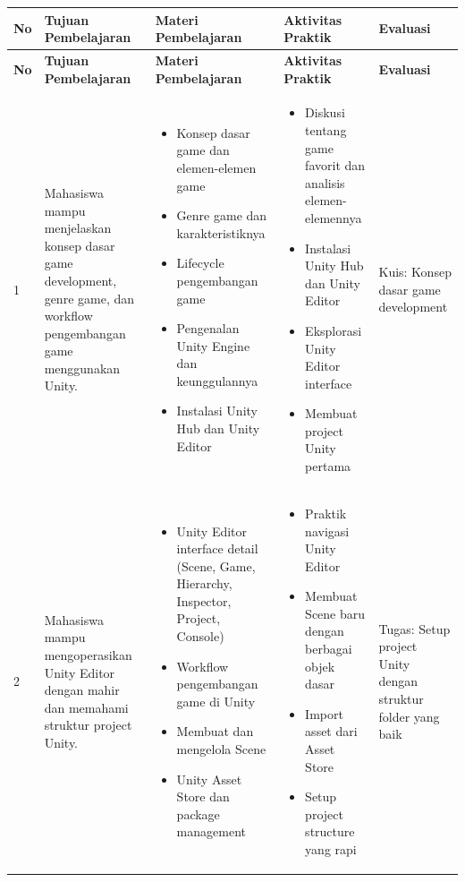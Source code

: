 \begin{longtable}{|p{0.8cm}|p{3.5cm}|p{4cm}|p{4cm}|p{2.5cm}|}
\hline
\textbf{No} & \textbf{Tujuan Pembelajaran} & \textbf{Materi Pembelajaran} & \textbf{Aktivitas Praktik} & \textbf{Evaluasi} \\
\hline
\endfirsthead

\hline
\textbf{No} & \textbf{Tujuan Pembelajaran} & \textbf{Materi Pembelajaran} & \textbf{Aktivitas Praktik} & \textbf{Evaluasi} \\
\hline
\endhead

\hline
\endfoot

\hline
\endlastfoot

1 & Mahasiswa mampu menjelaskan konsep dasar game development, genre game, dan workflow pengembangan game menggunakan Unity. & 
\begin{itemize}[leftmargin=*,nosep]
\item Konsep dasar game dan elemen-elemen game
\item Genre game dan karakteristiknya
\item Lifecycle pengembangan game
\item Pengenalan Unity Engine dan keunggulannya
\item Instalasi Unity Hub dan Unity Editor
\end{itemize} & 
\begin{itemize}[leftmargin=*,nosep]
\item Diskusi tentang game favorit dan analisis elemen-elemennya
\item Instalasi Unity Hub dan Unity Editor
\item Eksplorasi Unity Editor interface
\item Membuat project Unity pertama
\end{itemize} & 
Kuis: Konsep dasar game development \\
\hline

2 & Mahasiswa mampu mengoperasikan Unity Editor dengan mahir dan memahami struktur project Unity. & 
\begin{itemize}[leftmargin=*,nosep]
\item Unity Editor interface detail (Scene, Game, Hierarchy, Inspector, Project, Console)
\item Workflow pengembangan game di Unity
\item Membuat dan mengelola Scene
\item Unity Asset Store dan package management
\end{itemize} & 
\begin{itemize}[leftmargin=*,nosep]
\item Praktik navigasi Unity Editor
\item Membuat Scene baru dengan berbagai objek dasar
\item Import asset dari Asset Store
\item Setup project structure yang rapi
\end{itemize} & 
Tugas: Setup project Unity dengan struktur folder yang baik \\
\hline


\end{longtable}
